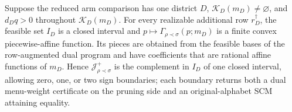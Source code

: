 Suppose the reduced arm comparison has one district \(D\), \(\mathcal K_D(m_D)\ne\varnothing\), and \(d_Dq>0\) throughout \(\mathcal K_D(m_D)\). For every realizable additional row \(r_D^\dagger\), the feasible set \(I_D\) is a closed interval and \(p\mapsto\Gamma_{\rho\prec\sigma}(p;m_D)\) is a finite convex piecewise-affine function. Its pieces are obtained from the feasible bases of the row-augmented dual program and have coefficients that are rational affine functions of \(m_D\). Hence \(\mathcal J_{\rho\prec\sigma}^+\) is the complement in \(I_D\) of one closed interval, allowing zero, one, or two sign boundaries; each boundary returns both a dual menu-weight certificate on the pruning side and an original-alphabet SCM attaining equality.